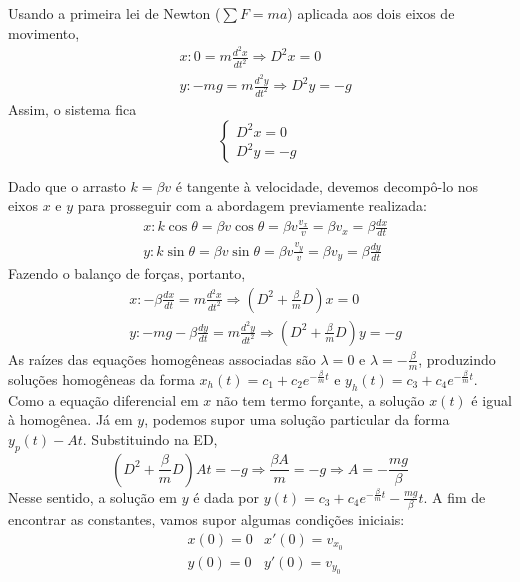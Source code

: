 \documentclass[oneside,12pt,a4paper]{report}
\begin{document}
    \begin{resolucao}
        \itemresolucao Usando a primeira lei de Newton ($\sum F=ma$) aplicada aos dois eixos de movimento,
        \begin{align*}
            &x: 0=m\frac{d^2x}{dt^2}\Rightarrow D^2x=0\\
            &y: -mg=m\frac{d^2y}{dt^2}\Rightarrow D^2y=-g
        \end{align*}
        Assim, o sistema fica
        \[\boxed{\begin{cases}
            D^2x=0\\
            D^2y=-g
        \end{cases}}\]

        \itemresolucao Dado que o arrasto $k=\beta v$ é tangente à velocidade, devemos decompô-lo nos eixos $x$ e $y$ para prosseguir com a abordagem previamente realizada:
        \begin{align*}
            &x:k\cos\theta=\beta v\cos\theta=\beta v \frac{v_x}{v}=\beta v_x = \beta\frac{dx}{dt}\\
            &y:k\sin\theta=\beta v\sin\theta=\beta v \frac{v_y}{v}=\beta v_y = \beta\frac{dy}{dt}
        \end{align*}
        Fazendo o balanço de forças, portanto,
        \begin{align*}
            &x: -\beta\frac{dx}{dt}=m\frac{d^2x}{dt^2}\Rightarrow \left(D^2+\frac{\beta}{m}D\right)x=0\\
            &y: -mg-\beta\frac{dy}{dt}=m\frac{d^2y}{dt^2}\Rightarrow \left(D^2+\frac{\beta}{m}D\right)y=-g
        \end{align*}
        As raízes das equações homogêneas associadas são $\lambda=0$ e $\lambda=-\frac{\beta}{m}$, produzindo soluções homogêneas da forma $x_h(t)=c_1+c_2e^{-\frac{\beta}{m}t}$ e $y_h(t)=c_3+c_4e^{-\frac{\beta}{m}t}$. Como a equação diferencial em $x$ não tem termo forçante, a solução $x(t)$ é igual à homogênea. Já em $y$, podemos supor uma solução particular da forma $y_p(t)-At$. Substituindo na ED,
        \[\left(D^2+\frac{\beta}{m}D\right)At=-g\Rightarrow\frac{\beta A}{m}=-g\Rightarrow A=-\frac{mg}{\beta}\]
        Nesse sentido, a solução em $y$ é dada por $y(t)=c_3+c_4e^{-\frac{\beta}{m}t}-\frac{mg}{\beta}t$. A fim de encontrar as constantes, vamos supor algumas condições iniciais:
        \begin{align*}
            &x(0)=0 &x'(0)=v_{x_0}\\
            &y(0)=0 &y'(0)=v_{y_0}\\

\end{align*}
\end{resolucao}
\end{document}
